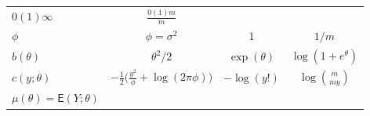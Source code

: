 \documentclass[12pt,a4paper,UTF8,twoside]{book}
\theoremstyle{definition}
\theoremstyle{definition}
\theoremstyle{definition}
\theoremstyle{remark}
\begin{document}
\begin{longtable}[]{@{}lccc@{}}
\begin{minipage}[t]{0.22\columnwidth}
\(0(1)\infty\)\strut
\end{minipage} & \begin{minipage}[t]{0.22\columnwidth}\centering
\(\frac{0(1)m}{m}\)\strut
\end{minipage}\tabularnewline
\begin{minipage}[t]{0.21\columnwidth}\raggedright
\(\phi\)\strut
\end{minipage} & \begin{minipage}[t]{0.22\columnwidth}\centering
\(\phi = \sigma^2\)\strut
\end{minipage} & \begin{minipage}[t]{0.22\columnwidth}\centering
\(1\)\strut
\end{minipage} & \begin{minipage}[t]{0.22\columnwidth}\centering
\(1/m\)\strut
\end{minipage}\tabularnewline
\begin{minipage}[t]{0.21\columnwidth}\raggedright
\(b(\theta)\)\strut
\end{minipage} & \begin{minipage}[t]{0.22\columnwidth}\centering
\(\theta^2/2\)\strut
\end{minipage} & \begin{minipage}[t]{0.22\columnwidth}\centering
\(\exp(\theta)\)\strut
\end{minipage} & \begin{minipage}[t]{0.22\columnwidth}\centering
\(\log(1+e^{\theta})\)\strut
\end{minipage}\tabularnewline
\begin{minipage}[t]{0.21\columnwidth}\raggedright
\(c(y;\theta)\)\strut
\end{minipage} & \begin{minipage}[t]{0.22\columnwidth}\centering
\(-\frac{1}{2}\big( \frac{y^2}{\phi} + \log(2\pi\phi) \big)\)\strut
\end{minipage} & \begin{minipage}[t]{0.22\columnwidth}\centering
\(-\log(y!)\)\strut
\end{minipage} & \begin{minipage}[t]{0.22\columnwidth}\centering
\(\log\binom{m}{my}\)\strut
\end{minipage}\tabularnewline
\begin{minipage}[t]{0.21\columnwidth}\raggedright
\(\mu(\theta) = \mathsf{E}(Y;\theta)\)\strut
\end{minipage} & \begin{minipage}[t]{0.22\columnwidth}\centering

\end{minipage}
\end{longtable}
\end{document}
